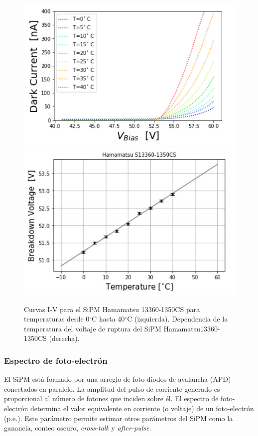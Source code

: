 \begin{figure}[h!]
\centering
\includegraphics[scale=0.32]{Figures/IVSiPM.jpeg} 
\includegraphics[scale=0.48]{Figures/VbT.jpeg}
\caption{Curvas I-V para el SiPM Hamamatsu 13360-1350CS para temperaturas desde 0$^{\circ}$C hasta 40$^{\circ}$C (izquierda). Dependencia de la temperatura del voltaje de ruptura del SiPM Hamamatsu13360-1350CS (derecha). }
\label{IVSiPM}
\end{figure}

\subsubsection{Espectro de foto-electrón}

El SiPM está formado por una arreglo de foto-diodos de avalancha (APD) conectados en paralelo. La amplitud del pulso de corriente generado es proporcional al número de fotones que inciden sobre él. El espectro de foto-electrón determina el valor equivalente en corriente (o voltaje) de un foto-electrón (p.e.). Este parámetro permite estimar otros parámetros del SiPM como la ganancia, conteo oscuro, \textit{cross-talk} y \textit{after-pulse}.\\

